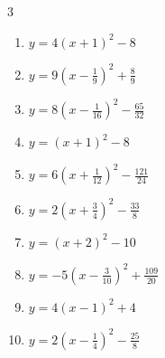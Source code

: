 \begin{multicols}{3}
\begin{enumerate}
  \item $\displaystyle y=4\left( x+1\right)^{2}-8$

        \phantom{$\displaystyle 頂点\left( -1 , -8 \right)$}

  \item $\displaystyle y=9\left( x-\frac{1}{9}\right)^{2}+\frac{8}{9}$


  \item $\displaystyle y=8\left( x-\frac{1}{16}\right)^{2}-\frac{65}{32}$


  \item $\displaystyle y=\left( x+1\right)^{2}-8$

        \phantom{$\displaystyle 頂点\left( -1 , -8 \right)$}

\columnbreak %

  \item $\displaystyle y=6\left( x+\frac{1}{12}\right)^{2}-\frac{121}{24}$


  \item $\displaystyle y=2\left( x+\frac{3}{4}\right)^{2}-\frac{33}{8}$


  \item $\displaystyle y=\left( x+2\right)^{2}-10$

        \phantom{$\displaystyle 頂点\left( -2 , -10 \right)$}

  \item $\displaystyle y=-5\left( x-\frac{3}{10}\right)^{2}+\frac{109}{20}$


  \item $\displaystyle y=4\left( x-1\right)^{2}+4$

        \phantom{$\displaystyle 頂点\left( 1 , 4 \right)$}

  \item $\displaystyle y=2\left( x-\frac{1}{4}\right)^{2}-\frac{25}{8}$



\end{enumerate}
\end{multicols}
